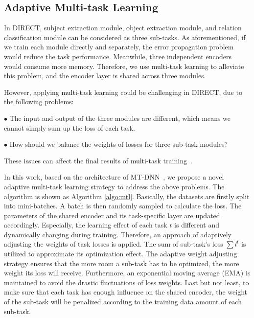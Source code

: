 \documentclass[11pt,a4paper]{article}
\begin{document}
\subsection{Adaptive Multi-task Learning}
In DIRECT, subject extraction module, object extraction module, and relation classification module can be considered as three sub-tasks. As aforementioned, if we train each module directly and separately, the error propagation problem would reduce the task performance. Meanwhile, three independent encoders would consume more memory. Therefore, we use multi-task learning to alleviate this problem, and the encoder layer is shared across three modules.

However, applying multi-task learning could be challenging in DIRECT, due to the following problems:

$\bullet$ The input and output of the three modules are different, which means we cannot simply sum up the loss of each task.

$\bullet$ How should we balance the weights of losses for three sub-task modules?

These issues can affect the final results of multi-task training~\cite{shen2019multi,sener2018multi}.

In this work, based on the architecture of MT-DNN~\cite{liu2019multi}, we propose a novel adaptive multi-task learning strategy to address the above problems. The algorithm is shown as Algorithm \ref{algo:mtl}. Basically, the datasets are firstly split into mini-batches. A batch is then randomly sampled to calculate the loss. The parameters of the shared encoder and its task-specific layer are updated accordingly. Especially, the learning effect of each task $t$ is different and dynamically changing during training. Therefore, an approach of adaptively adjusting the weights of task losses is applied. The sum of sub-task's loss $\sum l^t$ is utilized to approximate its optimization effect. The adaptive weight adjusting strategy ensures that the more room a sub-task has to be optimized, the more weight its loss will receive. Furthermore, an exponential moving average (EMA) \cite{lawrance1977exponential} is maintained to avoid the drastic fluctuations of loss weights. Last but not least, to make sure that each task has enough influence on the shared encoder, the weight of the sub-task will be penalized according to the training data amount of each sub-task.
\end{document}

